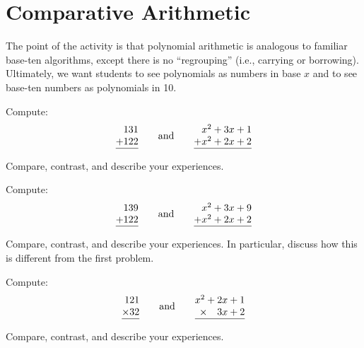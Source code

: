 \newpage
\section{Comparative Arithmetic}\label{A:CA}

\begin{teachingnote}
The point of the activity is that polynomial arithmetic is analogous to familiar base-ten algorithms, except there is no ``regrouping'' (i.e., carrying or borrowing).  Ultimately, we want students to see polynomials as numbers in base $x$ and to see base-ten numbers as polynomials in 10.
\end{teachingnote}

\begin{prob} Compute:
\[
\begin{array}{@{}r@{}}
131\\
+122\\ \hline
\end{array}
\qquad\text{and}
\qquad
\begin{array}{@{}r@{}}
x^2+3x+1\\
+x^2+2x+2\\ \hline
\end{array}
\]

\vspace{0.5in}
Compare, contrast, and describe your experiences.
\end{prob}

\begin{prob} Compute:
\[
\begin{array}{@{}r@{}}
139\\
+122\\ \hline
\end{array}
\qquad\text{and}
\qquad
\begin{array}{@{}r@{}}
x^2+3x+9\\
+x^2+2x+2\\ \hline
\end{array}
\]

\vspace{0.5in}
Compare, contrast, and describe your experiences. In particular,
discuss how this is different from the first problem.
\end{prob}


\begin{prob} Compute:
\[
\begin{array}{@{}r@{}}
121\\
\times 32\\ \hline
\end{array}
\qquad\text{and}
\qquad
\begin{array}{@{}r@{}}
x^2+2x+1\\
\times~~~3x+2\\ \hline
\end{array}
\]
\vspace{0.8in}

Compare, contrast, and describe your experiences.
\end{prob}

